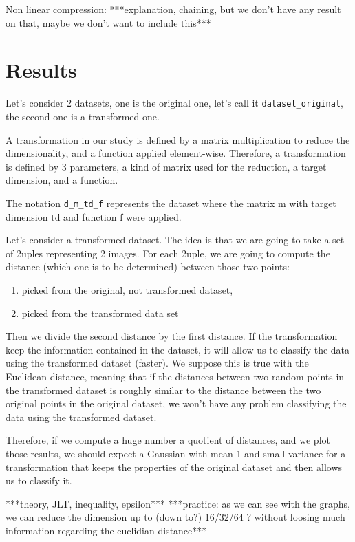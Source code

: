 \documentclass[11pt,a4paper]{article}
\begin{document}
	Non linear compression:
	***explanation, chaining, but we don't have any result on that, maybe we don't want to include this***
	
	\section{Results}
	Let's consider 2 datasets, one is the original one, let's call it \texttt{dataset\_original}, the second one is a transformed one.
	
	
	A transformation in our study is defined by a matrix multiplication to reduce the dimensionality, and a function applied element-wise. Therefore, a transformation is defined by 3 parameters, a kind of matrix used for the reduction, a target dimension, and a function.
	
	
	The notation \texttt{d\_m\_td\_f} represents the dataset where the matrix m with target dimension td and function f were applied.
	
	Let's consider a transformed dataset. The idea is that we are going to take a set of 2uples representing 2 images. For each 2uple, we are going to compute the distance (which one is to be determined) between those two points:
	
	\begin{enumerate}
		\item picked from the original, not transformed dataset,
		\item picked from the transformed data set
	\end{enumerate}

	Then we divide the second distance by the first distance. If the transformation keep the information contained in the dataset, it will allow us to classify the data using the transformed dataset (faster). We suppose this is true with the Euclidean distance, meaning that if the distances between two random points in the transformed dataset is roughly similar to the distance between the two original points in the original dataset, we won't have any problem classifying the data using the transformed dataset.
	
	
	Therefore, if we compute a huge number a quotient of distances, and we plot those results, we should expect a Gaussian with mean 1 and small variance for a transformation that keeps the properties of the original dataset and then allows us to classify it.
	
	
	***theory, JLT, inequality, epsilon***
	***practice: as we can see with the graphs, we can reduce the dimension up to (down to?) 16/32/64 ? without loosing much information regarding the euclidian distance***
	
\end{document}
